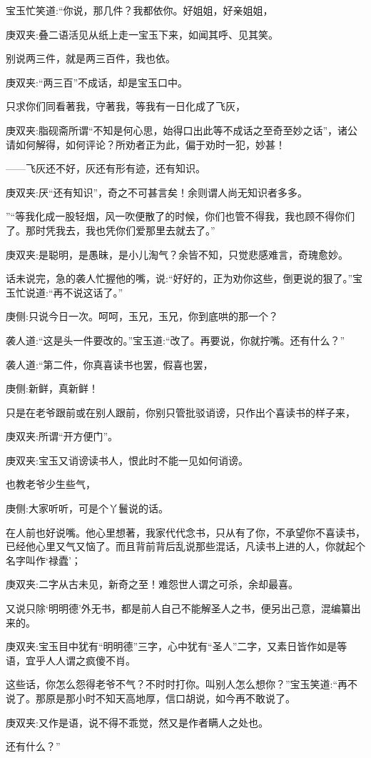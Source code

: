 \begin{parag}
    宝玉忙笑道:“你说，那几件？我都依你。好姐姐，好亲姐姐，\begin{note}庚双夹:叠二语活见从纸上走一宝玉下来，如闻其呼、见其笑。\end{note}别说两三件，就是两三百件，我也依。\begin{note}庚双夹:“两三百”不成话，却是宝玉口中。\end{note}只求你们同看著我，守著我，等我有一日化成了飞灰，\begin{note}庚双夹:脂砚斋所谓“不知是何心思，始得口出此等不成话之至奇至妙之话”，诸公请如何解得，如何评论？所劝者正为此，偏于劝时一犯，妙甚！\end{note}——飞灰还不好，灰还有形有迹，还有知识。\begin{note}庚双夹:厌“还有知识”，奇之不可甚言矣！余则谓人尚无知识者多多。\end{note}”“等我化成一股轻烟，风一吹便散了的时候，你们也管不得我，我也顾不得你们了。那时凭我去，我也凭你们爱那里去就去了。”\begin{note}庚双夹:是聪明，是愚昧，是小儿淘气？余皆不知，只觉悲感难言，奇瑰愈妙。\end{note}话未说完，急的袭人忙握他的嘴，说:“好好的，正为劝你这些，倒更说的狠了。”宝玉忙说道:“再不说这话了。”\begin{note}庚侧:只说今日一次。呵呵，玉兄，玉兄，你到底哄的那一个？\end{note}袭人道:“这是头一件要改的。”宝玉道:“改了。再要说，你就拧嘴。还有什么？”
\end{parag}


\begin{parag}
    袭人道:“第二件，你真喜读书也罢，假喜也罢，\begin{note}庚侧:新鲜，真新鲜！\end{note}只是在老爷跟前或在别人跟前，你别只管批驳诮谤，只作出个喜读书的样子来，\begin{note}庚双夹:所谓“开方便门”。\end{note}\begin{note}庚双夹:宝玉又诮谤读书人，恨此时不能一见如何诮谤。\end{note}也教老爷少生些气，\begin{note}庚侧:大家听听，可是个丫鬟说的话。\end{note}在人前也好说嘴。他心里想著，我家代代念书，只从有了你，不承望你不喜读书，已经他心里又气又恼了。而且背前背后乱说那些混话，凡读书上进的人，你就起个名字叫作‘禄蠹’；\begin{note}庚双夹:二字从古未见，新奇之至！难怨世人谓之可杀，余却最喜。\end{note}又说只除‘明明德’外无书，都是前人自己不能解圣人之书，便另出己意，混编纂出来的。\begin{note}庚双夹:宝玉目中犹有“明明德”三字，心中犹有“圣人”二字，又素日皆作如是等语，宜乎人人谓之疯傻不肖。\end{note}这些话，你怎么怨得老爷不气？不时时打你。叫别人怎么想你？”宝玉笑道:“再不说了。那原是那小时不知天高地厚，信口胡说，如今再不敢说了。\begin{note}庚双夹:又作是语，说不得不乖觉，然又是作者瞒人之处也。\end{note}还有什么？”
\end{parag}



